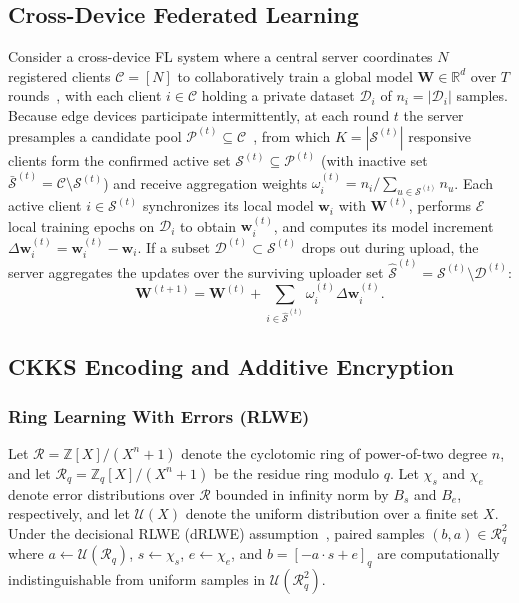 \subsection{Cross-Device Federated Learning}
\label{sec:cdfl}
Consider a cross-device FL system where a central server coordinates $N$ registered clients $\mathcal{C} = [N]$ to collaboratively train a global model $\mathbf{W} \in \mathbb{R}^d$ over $T$ rounds~\cite{mcmahan2017communication}, with each client $i \in \mathcal{C}$ holding a private dataset $\mathcal{D}_i$ of $n_i = |\mathcal{D}_i|$ samples. Because edge devices participate intermittently, at each round $t$ the server presamples a candidate pool $\mathcal{P}^{(t)} \subseteq \mathcal{C}$~\cite{yan2025fedfetch}, from which $K = |\mathcal{S}^{(t)}|$ responsive clients form the confirmed active set $\mathcal{S}^{(t)} \subseteq \mathcal{P}^{(t)}$ (with inactive set $\bar{\mathcal{S}}^{(t)} = \mathcal{C} \setminus \mathcal{S}^{(t)}$) and receive aggregation weights $\omega_i^{(t)} = n_i / \sum_{u \in \mathcal{S}^{(t)}} n_u$. Each active client $i \in \mathcal{S}^{(t)}$ synchronizes its local model $\mathbf{w}_i$ with $\mathbf{W}^{(t)}$, performs $\mathcal{E}$ local training epochs on $\mathcal{D}_i$ to obtain $\mathbf{w}_i^{(t)}$, and computes its model increment $\Delta\mathbf{w}_i^{(t)} = \mathbf{w}_i^{(t)} - \mathbf{w}_i$. If a subset $\mathcal{D}^{(t)} \subset \mathcal{S}^{(t)}$ drops out during upload, the server aggregates the updates over the surviving uploader set $\widehat{\mathcal{S}}^{(t)} = \mathcal{S}^{(t)} \setminus \mathcal{D}^{(t)}$:
\begin{equation}
\mathbf{W}^{(t+1)} = \mathbf{W}^{(t)} + \sum_{i \in \widehat{\mathcal{S}}^{(t)}} \omega_i^{(t)} \Delta\mathbf{w}_i^{(t)}.
\end{equation}



\subsection{CKKS Encoding and Additive Encryption}
\label{sec:ckks}

\subsubsection{Ring Learning With Errors (RLWE)}
Let $\mathcal{R} = \mathbb{Z}[X]/(X^n + 1)$ denote the cyclotomic ring of power-of-two degree $n$, and let $\mathcal{R}_q = \mathbb{Z}_q[X]/(X^n + 1)$ be the residue ring modulo $q$. Let $\chi_s$ and $\chi_e$ denote error distributions over $\mathcal{R}$ bounded in infinity norm by $B_s$ and $B_e$, respectively, and let $\mathcal{U}(X)$ denote the uniform distribution over a finite set $X$. Under the decisional RLWE (dRLWE) assumption~\cite{lyubashevsky2010ideal}, paired samples $(b, a) \in \mathcal{R}_q^2$ where $a \leftarrow \mathcal{U}(\mathcal{R}_q)$, $s \leftarrow \chi_s$, $e \leftarrow \chi_e$, and $b = [-a \cdot s + e]_q$ are computationally indistinguishable from uniform samples in $\mathcal{U}(\mathcal{R}_q^2)$.

